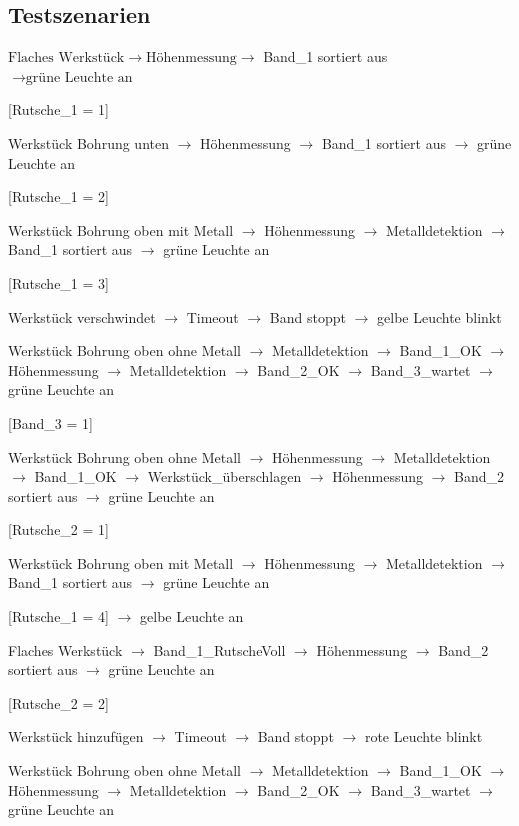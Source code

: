 \documentclass[a4paper, 11pt]{article}
\begin{document}
\subsection{Testszenarien}
\begin{compactenum}[1.]
    \item $\text{Flaches Werkstück} \rightarrow \text{Höhenmessung} \rightarrow$
        Band\_1 sortiert aus $\rightarrow \text{grüne Leuchte an}$
        
        [Rutsche\_1 = 1]\medskip
    \item Werkstück Bohrung unten $\rightarrow$ Höhenmessung $\rightarrow$ Band\_1 sortiert aus $\rightarrow$ grüne Leuchte an
    
        [Rutsche\_1 = 2]\medskip
    \item Werkstück Bohrung oben mit Metall $\rightarrow$ Höhenmessung $\rightarrow$ Metalldetektion $\rightarrow$ Band\_1 sortiert aus $\rightarrow$ grüne Leuchte an
    
        [Rutsche\_1 = 3]\medskip
    \item Werkstück verschwindet $\rightarrow$ Timeout $\rightarrow$ Band stoppt $\rightarrow$ gelbe Leuchte blinkt \medskip
    \item Werkstück Bohrung oben ohne Metall $\rightarrow$ Metalldetektion $\rightarrow$ Band\_1\_OK $\rightarrow$ Höhenmessung $\rightarrow$ Metalldetektion $\rightarrow$ Band\_2\_OK 
    $\rightarrow$ Band\_3\_wartet $\rightarrow$ grüne Leuchte an 
    
    [Band\_3 = 1]\medskip
    \item Werkstück Bohrung oben ohne Metall $\rightarrow$ Höhenmessung $\rightarrow$ Metalldetektion $\rightarrow$ Band\_1\_OK $\rightarrow$ Werkstück\_überschlagen $\rightarrow$ 
    Höhenmessung $\rightarrow$ Band\_2 sortiert aus $\rightarrow$ grüne Leuchte an
    
    [Rutsche\_2 = 1]\medskip
    \item Werkstück Bohrung oben mit Metall $\rightarrow$ Höhenmessung $\rightarrow$ Metalldetektion $\rightarrow$ Band\_1 sortiert aus $\rightarrow$ grüne Leuchte an
    
    [Rutsche\_1 = 4] $\rightarrow$ gelbe Leuchte an\medskip
    \item Flaches Werkstück $\rightarrow$ Band\_1\_RutscheVoll $\rightarrow$ Höhenmessung $\rightarrow$ Band\_2 sortiert aus $\rightarrow$ grüne Leuchte an
    
    [Rutsche\_2 = 2]\medskip
    \item Werkstück hinzufügen $\rightarrow$ Timeout $\rightarrow$ Band stoppt $\rightarrow$ rote Leuchte blinkt\medskip
    \item Werkstück Bohrung oben ohne Metall $\rightarrow$ Metalldetektion $\rightarrow$ Band\_1\_OK $\rightarrow$ Höhenmessung $\rightarrow$ Metalldetektion $\rightarrow$ Band\_2\_OK 
    $\rightarrow$ Band\_3\_wartet $\rightarrow$ grüne Leuchte an
    

\end{compactenum}
\end{document}
